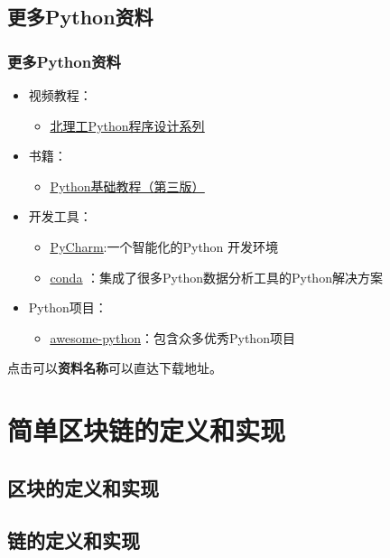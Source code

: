 \documentclass[11pt]{beamer}
\begin{document}
\subsection{更多Python资料}
\begin{frame}[fragile]
	\frametitle{更多Python资料}
	
\begin{itemize}
		\item 	视频教程：
		\begin{itemize}
			\item \href{http://www.icourse163.org/course/BIT-268001}{\underline{北理工Python程序设计系列}}
		\end{itemize}

		\item 	书籍：
		\begin{itemize}
			\item \href{https://item.jd.com/12279949.html}{\underline{Python基础教程（第三版）}}
		\end{itemize}

		\item 	开发工具：
		\begin{itemize}
			\item \href{https://www.jetbrains.com/pycharm/}{\underline{PyCharm}}:一个智能化的Python 开发环境
			\item \href{https://www.anaconda.com/products/individual}{\underline{conda}} ：集成了很多Python数据分析工具的Python解决方案
		\end{itemize}

		\item 	Python项目：
		\begin{itemize}
			\item \href{https://github.com/vinta/awesome-python}{\underline{awesome-python}}：包含众多优秀Python项目
		\end{itemize}
\end{itemize}

{\small 点击可以\textbf{资料名称}可以直达下载地址}。
\end{frame}

\section{简单区块链的定义和实现}
\subsection{区块的定义和实现}

\subsection{链的定义和实现}
\end{document}
